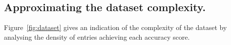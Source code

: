 \subsection{Approximating the dataset complexity.}

Figure~\ref{fig:dataset} gives an indication of the complexity of the dataset by analysing the density of entries achieving each accuracy score.




